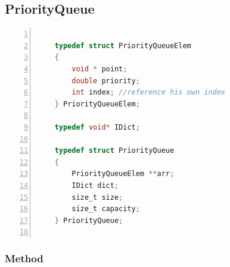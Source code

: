 \documentclass[twoside,12pt, a4paper]{report}
\begin{document}
\subsection{PriorityQueue}

\begin{lstlisting}[language=C, % Spécifie le langage du code
	caption={PriorityQueue}, % Légende du listing
	label=lst:prqueue_c, % Étiquette pour référencer le listing
	numbers=left, 
	numberstyle=\tiny\color{gray}, 
	stepnumber=1, 
	frame=single,
	breaklines=true, 
	postbreak=\mbox{\textcolor{red}{$\hookrightarrow$}\space},
	showstringspaces=false 
	]
	
	typedef struct PriorityQueueElem
	{
		void * point;
		double priority;
		int index; //reference his own index
	} PriorityQueueElem;
	
	typedef void* IDict;
	
	typedef struct PriorityQueue
	{
		PriorityQueueElem **arr;
		IDict dict;
		size_t size;
		size_t capacity;
	} PriorityQueue;
	
\end{lstlisting}

\subsubsection{Method}
\end{document}
